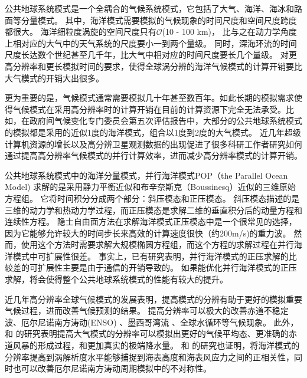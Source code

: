 公共地球系统模式是一个全耦合的气候系统模式，它包括了大气、海洋、海冰和路面等分量模式。
其中，海洋模式需要模拟的气候现象的时间尺度和空间尺度跨度都很大。 
海洋细粒度涡旋的空间尺度只有$\mathcal{O}$(10 - 100 km)， 比与之在动力学角度上相对应的大气中的天气系统的尺度要小一到两个量级。
同时，深海环流的时间尺度长达数个世纪甚至几千年，比大气中相对应的时间尺度要长几个量级。
对更高分辨率和更长模拟时间的要求，使得全球涡分辨的海洋气候模式的计算开销要比大气模式的开销大出很多\cite{bryan2010frontal,mcclean2011prototype,graham2014importance}。


更为重要的是，气候模式通常需要模拟几十年甚至数百年。如此长期的模拟需求使得气候模式在采用高分辨率时的计算开销在目前的计算资源下完全无法承受。比如，在政府间气候变化专门委员会第五次评估报告中，大部分的公共地球系统模式的模拟都是采用的近似1度的海洋模式，组合以1度到2度的大气模式。
近几年超级计算机资源的增长以及高分辨卫星观测数据的出现促进了很多科研工作者研究如何通过提高高分辨率气候模式的并行计算效率，进而减少高分辨率模式的计算开销。


公共地球系统模式中的海洋分量模式，并行海洋模式POP（the Parallel Ocean Model) 求解的是采用静力平衡近似和布辛奈斯克（Boussinesq）近似的三维原始方程组。 
它将时间积分分成两个部分：斜压模态和正压模态。 
斜压模态描述的是三维的动力学和热动力学过程，而正压模态是求解二维的垂直积分后的动量方程和连续性方程。
隐士自由面方法在求解海洋模式正压模态中是一个很常见的选择，因为它能够允许较大的时间步长来高效的计算速度很快（约200m/s)的重力波。
然而，使用这个方法时需要求解大规模椭圆方程组，而这个方程的求解过程在并行海洋模式中可扩展性很差。
事实上，已有研究表明，并行海洋模式的正压求解的比较差的可扩展性主要是由于通信的开销导致的\cite{Worley:2011:PCE:2063384.2063457}。 
如果能优化并行海洋模式的正压求解，将会使得整个公共地球系统模式的性能有较大的提升\cite{dennis2012computational}。 

近几年高分辨率全球气候模式的发展表明，提高模式的分辨有助于更好的模拟重要气候过程，进而改善气候预测的结果。
提高分辨率可以极大的改善赤道不稳定波\citep{roberts2009impact}、厄尔尼诺南方涛动(ENSO) \citep{shaffrey2009uk}、墨西哥湾流\citep{chassignet2008gulf, kuwano2010precipitation} 、全球水循环\citep{demory2014role}等气候现象。
此外，\cite{gent2010improvements} 和 \cite{wehner2014effect}的研究表明提高大气模式的分辨率可以模拟出更好的气候平均态、更准确的赤道风暴的形成过程，和更加真实的极端降水量。
 \cite{bryan2010frontal} 和 \cite{graham2014importance}的研究也证明，将海洋模式的分辨率提高到涡解析度水平能够捕捉到海表高度和海表风应力之间的正相关性，同时也可以改善厄尔尼诺南方涛动周期模拟中的不对称性。


